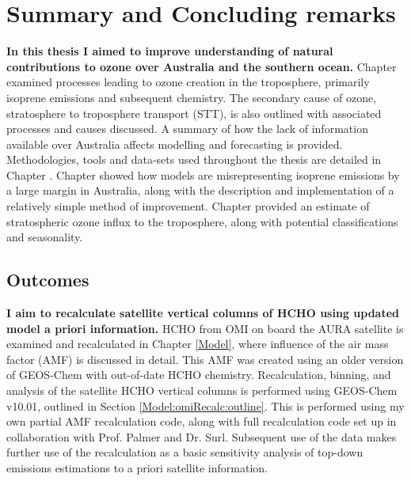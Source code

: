 \chapter{Summary and Concluding remarks} %
\label{Conclusions}

  \textbf{In this thesis I aimed to improve understanding of natural contributions to ozone over Australia and the southern ocean.}
  Chapter  examined processes leading to ozone creation in the troposphere, primarily isoprene emissions and subsequent chemistry.
  The secondary cause of ozone, stratosphere to troposphere transport (STT), is also outlined with associated processes and causes discussed.
  A summary of how the lack of information available over Australia affects modelling and forecasting is provided.
  Methodologies, tools and data-sets used throughout the thesis are detailed in Chapter .
  Chapter  showed how models are misrepresenting isoprene emissions by a large margin in Australia, along with the description and implementation of a relatively simple method of improvement.
  Chapter  provided an estimate of stratospheric ozone influx to the troposphere, along with potential classifications and seasonality.

\section{Outcomes}
\label{Conclusions:aims}
  
  \textbf{I aim to recalculate satellite vertical columns of HCHO using updated model a priori information.}
  HCHO from OMI on board the AURA satellite %
  is examined and recalculated in Chapter \ref{Model}, where influence of the air mass factor (AMF) is discussed in detail. %
  This AMF was created using an older version of GEOS-Chem with out-of-date HCHO chemistry.
  Recalculation, binning, and analysis of the satellite HCHO vertical columns is performed using GEOS-Chem v10.01, outlined in Section \ref{Model:omiRecalc:outline}.
  This is performed using my own partial AMF recalculation code, along with full recalculation code set up in collaboration with Prof. Palmer and Dr. Surl.
  Subsequent use of the data makes further use of the recalculation as a basic sensitivity analysis of top-down emissions estimations to a priori satellite information.
   
